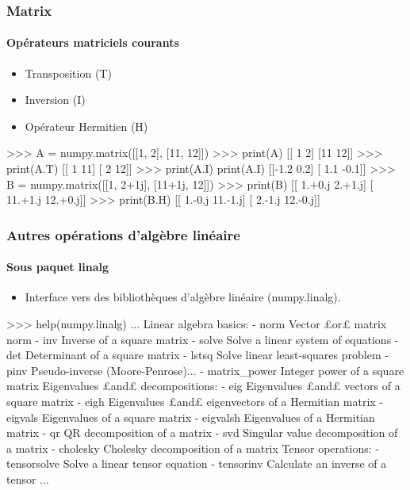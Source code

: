 \begin{frame}[fragile]
\frametitle{Matrix}
\framesubtitle{Opérateurs matriciels courants}
\begin{itemize}
 \item Transposition (T)
 \item Inversion (I)
 \item Opérateur Hermitien (H)
\end{itemize}
\begin{pythonConsole}
>>> A = numpy.matrix([[1, 2], [11, 12]])
>>> print(A)
[[ 1  2]
 [11 12]]
>>> print(A.T)
[[ 1 11]
 [ 2 12]]
>>> print(A.I)
print(A.I)
[[-1.2  0.2]
 [ 1.1 -0.1]]
>>> B = numpy.matrix([[1, 2+1j], [11+1j, 12]])
>>> print(B)
[[  1.+0.j   2.+1.j]
 [ 11.+1.j  12.+0.j]]
>>> print(B.H)
[[  1.-0.j  11.-1.j]
 [  2.-1.j  12.-0.j]]
\end{pythonConsole}
\end{frame}
\begin{frame}[fragile]
\frametitle{Autres opérations d'algèbre linéaire}
\framesubtitle{Sous paquet linalg}
\begin{itemize}
 \item Interface vers des bibliothèques d'algèbre linéaire (numpy.linalg). 
\end{itemize}
\begin{pythonConsole}
>>> help(numpy.linalg)
...
    Linear algebra basics:
    - norm            Vector £or£ matrix norm
    - inv             Inverse of a square matrix
    - solve           Solve a linear system of equations
    - det             Determinant of a square matrix
    - lstsq           Solve linear least-squares problem
    - pinv            Pseudo-inverse (Moore-Penrose)...
    - matrix_power    Integer power of a square matrix
    Eigenvalues £and£ decompositions:
    - eig             Eigenvalues £and£ vectors of a square matrix
    - eigh            Eigenvalues £and£ eigenvectors of a Hermitian matrix
    - eigvals         Eigenvalues of a square matrix
    - eigvalsh        Eigenvalues of a Hermitian matrix
    - qr              QR decomposition of a matrix
    - svd             Singular value decomposition of a matrix
    - cholesky        Cholesky decomposition of a matrix
    Tensor operations:
    - tensorsolve     Solve a linear tensor equation
    - tensorinv       Calculate an inverse of a tensor
...
\end{pythonConsole}
\end{frame}
